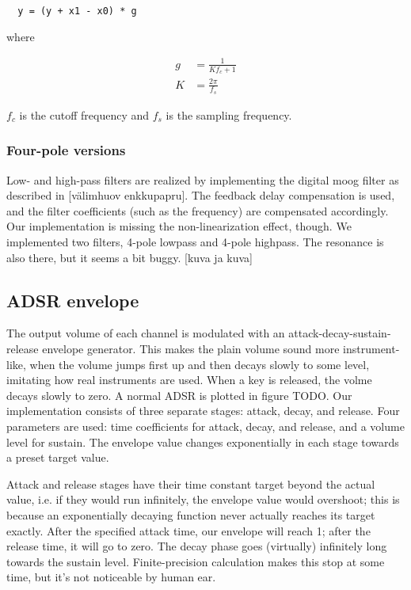 \documentclass[10pt,a4paper,oneside]{article}
\begin{document}
\begin{verbatim}
  y = (y + x1 - x0) * g
\end{verbatim}

where

\[
\begin{split}
  g &= \frac{1}{K f_c + 1}\\
  K &= \frac{2 \pi}{f_s}
\end{split}
\]

$f_c$ is the cutoff frequency and $f_s$ is the sampling frequency.


\subsubsection{Four-pole versions}

Low- and high-pass filters are realized by implementing the digital moog filter as described in [välimhuov enkkupapru]. The feedback delay compensation is used, and the filter coefficients (such as the frequency) are compensated accordingly. Our implementation is missing the non-linearization effect, though. We implemented two filters, 4-pole lowpass and 4-pole highpass. The resonance is also there, but it seems a bit buggy. [kuva ja kuva]


\subsection{ADSR envelope}

The output volume of each channel is modulated with an attack-decay-sustain-release envelope generator. This makes the plain volume sound more instrument-like, when the volume jumps first up and then decays slowly to some level, imitating how real instruments are used. When a key is released, the volme decays slowly to zero. A normal ADSR is plotted in figure TODO. Our implementation consists of three separate stages: attack, decay, and release. Four parameters are used: time coefficients for attack, decay, and release, and a volume level for sustain. The envelope value changes exponentially in each stage towards a preset target value.

Attack and release stages have their time constant target beyond the actual value, i.e. if they would run infinitely, the envelope value would overshoot; this is because an exponentially decaying function never actually reaches its target exactly. After the specified attack time, our envelope will reach 1; after the release time, it will go to zero. The decay phase goes (virtually) infinitely long towards the sustain level. Finite-precision calculation makes this stop at some time, but it's not noticeable by human ear.
\end{document}
